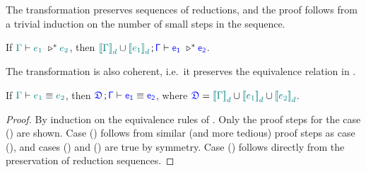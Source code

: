 The transformation preserves sequences of reductions, and the proof follows from a trivial induction on the number of small steps in the sequence.

\begin{lemma} If $\helper{\Gamma} \vdash \helper{e_1}\ \triangleright^* \helper{e_2}$, then
$\helper{\bbracket{\Gamma}_d} \cup \helper{\bbracket{e_1}_d} \semicolon \target{\Gamma} \vdash \target{e_1}\ \triangleright^* \target{e_2}$.
\label{lem:ccs prev sequence}
\end{lemma}


The transformation is also coherent, i.e.~it preserves the equivalence relation in {\ccs}.

\begin{lemma}
\label{lem:ccs coherence}
If $\color{teal}{\Gamma}\color{black} \vdash \color{teal}{e_1}\color{black} \equiv \color{teal}{e_2}\color{black}$, then 
$\target{\fdef} \semicolon \target{\Gamma} \vdash \target{e_1} \equiv \target{e_2}$, where
$\target{\fdef} = \helper{\bbracket{\Gamma}_d} \cup \helper{\bbracket{e_1}_d} \cup \helper{\bbracket{e_2}_d}$.
\begin{proof}
By induction on the equivalence rules of {\ccs}. Only the proof steps for the case () are shown. Case () follows from similar (and more tedious) proof steps as case (), and cases () and () are true by symmetry. Case () follows directly from the preservation of reduction sequences.


\end{proof}
\end{lemma}
